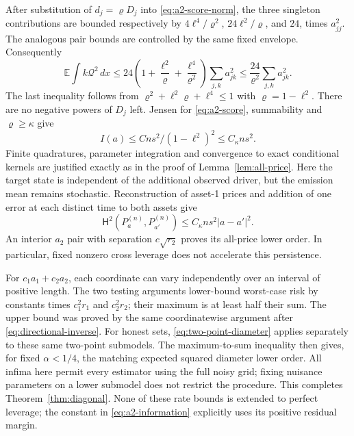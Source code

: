 \documentclass[11pt,a4paper]{amsart}
\theoremstyle{plain}
\theoremstyle{definition}
\theoremstyle{remark}
\newcommand{\EE}{\mathbb{E}}
\newcommand{\Hell}{\mathsf H}
\begin{document}
After substitution of $d_j=\varrho D_j$ into \eqref{eq:a2-score-norm}, the three
singleton contributions are bounded respectively by
$4\ell^4/\varrho^2$, $24\ell^2/\varrho$, and $24$, times $a_{jj}^2$.
The analogous pair bounds are controlled by the same fixed envelope.
Consequently
\begin{equation}\label{eq:a2-cancellation}
 \EE\int k\mathcal Q^2\,dx
 \le24\left(1+\frac{\ell^2}{\varrho}
                +\frac{\ell^4}{\varrho^2}\right)\sum_{j,k}a_{jk}^2
 \le\frac{24}{\varrho^2}\sum_{j,k}a_{jk}^2.
\end{equation}
The last inequality follows from
$\varrho^2+\ell^2\varrho+\ell^4\le1$ with $\varrho=1-\ell^2$.
There are no negative powers of $D_j$ left. Jensen for
\eqref{eq:a2-score}, summability and $\varrho\ge\kappa$ give
\begin{equation}\label{eq:a2-information}
 I(a)\le Cns^2/(1-\ell^2)^2\le C_\kappa ns^2.
\end{equation}
Finite quadratures, parameter integration and convergence to exact
conditional kernels are justified exactly as in the proof of
Lemma~\ref{lem:all-price}. Here the target state is independent of the
additional observed driver, but the emission mean remains stochastic. Reconstruction
of asset-1 prices and addition of one error at each distinct time to both
assets give
\begin{equation}\label{eq:a2-Hellinger}
 \Hell^2(P_a^{(n)},P_{a'}^{(n)})\le C_\kappa ns^2|a-a'|^2.
\end{equation}
An interior $a_2$ pair with separation $c\sqrt{r_2}$ proves its all-price
lower order. In particular, fixed nonzero cross leverage does not
accelerate this persistence.

For $c_1a_1+c_2a_2$, each coordinate can vary independently over an interval
of positive length. The two testing arguments lower-bound worst-case risk
by constants times $c_1^2r_1$ and $c_2^2r_2$; their maximum is at least
half their sum. The upper bound was proved by the same coordinatewise
argument after \eqref{eq:directional-inverse}. For honest sets,
\eqref{eq:two-point-diameter} applies separately to these same two-point
submodels. The maximum-to-sum inequality then gives, for fixed
$\alpha<1/4$, the matching expected squared diameter lower
order. All infima here permit every estimator using the full noisy grid;
fixing nuisance parameters on a lower submodel does not restrict the procedure.
This completes Theorem~\ref{thm:diagonal}. None of these rate bounds is
extended to perfect leverage; the constant in
\eqref{eq:a2-information} explicitly uses its positive residual margin.
\end{document}
